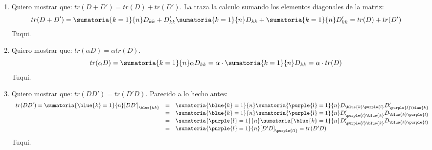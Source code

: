 \begin{enumerate}[label=(\alph*)]
  \item Quiero mostrar que: $tr(D + D') = tr(D) + tr(D')$.
        La traza la calculo sumando los elementos diagonales de la matriz:
        $$
          tr(D + D') =
          \sumatoria{k = 1}{n} D_{kk} + D'_{kk}
          \sumatoria{k = 1}{n}D_{kk} +
          \sumatoria{k = 1}{n}D'_{kk} =
          tr(D) + tr(D')
        $$
        Tuqui.

  \item Quiero mostrar que: $tr(\alpha D) = \alpha tr(D)$.
        $$
          tr(\alpha D) =
          \sumatoria{k = 1}{n} \alpha D_{kk} =
          \alpha \cdot \sumatoria{k = 1}{n}D_{kk} =
          \alpha \cdot tr(D)
        $$
        Tuqui.

  \item Quiero mostrar que: $tr(DD') = tr(D'D)$. Parecido a lo hecho antes:
        $$
          \begin{array}{rcl}
            tr(DD') =
            \sumatoria{\blue{k} = 1}{n} [DD']_{\blue{kk}} & = &
            \sumatoria{\blue{k} = 1}{n}
            \sumatoria{\purple{l} = 1}{n} D_{\blue{k}\purple{l}}D'_{\purple{l}\blue{k}} \\
                                                          & = &
            \sumatoria{\blue{k} = 1}{n}
            \sumatoria{\purple{l} = 1}{n} D'_{\purple{l}\blue{k}}D_{\blue{k}\purple{l}} \\
                                                          & = &
            \sumatoria{\purple{l} = 1}{n}
            \sumatoria{\blue{k} = 1}{n} D'_{\purple{l}\blue{k}}D_{\blue{k}\purple{l}}   \\
                                                          & = &
            \sumatoria{\purple{l} = 1}{n} [D'D]_{\purple{ll}}  = tr(D'D)
          \end{array}
        $$
        Tuqui.

\end{enumerate}

\begin{aportes}
  \item {}
\end{aportes}
